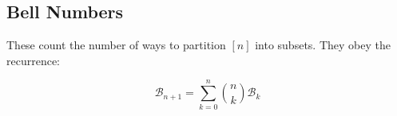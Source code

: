 \subsection{Bell Numbers} These count the number of ways to partition $[n]$ into subsets. They obey the recurrence:

\begin{equation*}
    \mathcal{B}_{n+1} = \sum_{k=0}^n \binom{n}{k} \mathcal{B}_k
\end{equation*}


\noindent{}

